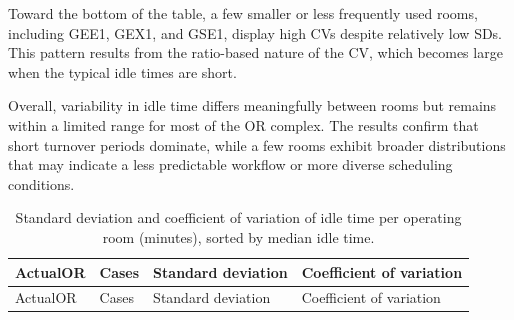 \documentclass[
]{article}
\begin{document}
Toward the bottom of the table, a few smaller or less frequently used
rooms, including GEE1, GEX1, and GSE1, display high CVs despite
relatively low SDs. This pattern results from the ratio-based nature of
the CV, which becomes large when the typical idle times are short.

Overall, variability in idle time differs meaningfully between rooms but
remains within a limited range for most of the OR complex. The results
confirm that short turnover periods dominate, while a few rooms exhibit
broader distributions that may indicate a less predictable workflow or
more diverse scheduling conditions.

\begin{longtable}[]{@{}
  >{\centering\arraybackslash}p{}
  >{\centering\arraybackslash}p{}
  >{\centering\arraybackslash}p{}
  >{\centering\arraybackslash}p{}@{}}
\caption{Standard deviation and coefficient of variation of idle time
per operating room (minutes), sorted by median idle time.
\label{tab:idle_variability}}\tabularnewline
\toprule\noalign{}
\begin{minipage}[b]{\linewidth}\centering
ActualOR
\end{minipage} & \begin{minipage}[b]{\linewidth}\centering
Cases
\end{minipage} & \begin{minipage}[b]{\linewidth}\centering
Standard deviation
\end{minipage} & \begin{minipage}[b]{\linewidth}\centering
Coefficient of variation
\end{minipage} \\
\midrule\noalign{}
\endfirsthead
\toprule\noalign{}
\begin{minipage}[b]{\linewidth}\centering
ActualOR
\end{minipage} & \begin{minipage}[b]{\linewidth}\centering
Cases
\end{minipage} & \begin{minipage}[b]{\linewidth}\centering
Standard deviation
\end{minipage} & \begin{minipage}[b]{\linewidth}\centering
Coefficient of variation
\end{minipage} \\

\end{longtable}
\end{document}

